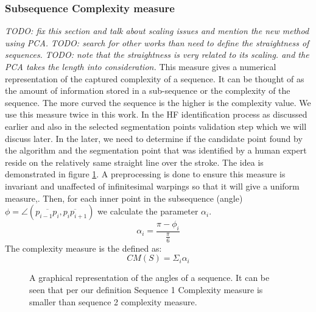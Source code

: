 \documentclass[journal,compsoc]{IEEEtran}
\begin{document}
\subsubsection{Subsequence Complexity measure}
\label{subsec:scm}
\emph{TODO: fix this section and talk about scaling issues and mention the new method using PCA.}
\emph{TODO: search for other works than need to define the straightness of sequences.}
\emph{TODO: note that the straightness is very related to its scaling. and the PCA takes the length into consideration.}
This measure gives a numerical representation of the captured complexity of a sequence. It can be thought of as the amount of information stored in a sub-sequence or the complexity of the sequence. The more curved the sequence is the higher is the complexity value. We use this measure twice in this work. In the HF identification process as discussed earlier and also in the selected segmentation points validation step which we will discuss later. In the later, we need to determine if the candidate point found by the algorithm and the segmentation point that was identified by a human expert reside on the relatively same straight line over the stroke. The idea is demonstrated in figure \ref{fig:sequence_complexity}.
A preprocessing is done to ensure this measure is invariant and unaffected of infinitesimal warpings so that it will give a uniform measure,. 
Then, for each inner point in the subsequence (angle) $\phi=\angle(\overline{p_{i-1}p_{i}},\overline{p_{i}p_{i+1}})$ we calculate the parameter $\alpha_{i}$.
\begin{equation}
 \alpha_{i}=\frac{\pi-\phi_{i}}{\frac{\pi}{6}}
\end{equation}
The complexity measure is the defined as:
\begin{equation}
CM(S)=\Sigma_{i}\alpha_{i}
\end{equation}

\begin{figure}[h]
     \begin{center}
    \end{center}
    \caption{A graphical representation of the angles of a sequence. It can be seen that per our definition Sequence 1 Complexity measure is smaller than sequence 2 complexity measure.}
   \label{fig:sequence_complexity}
\end{figure}
\end{document}
